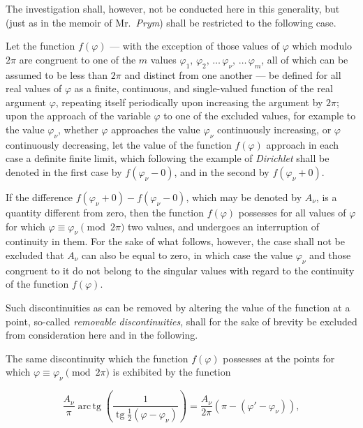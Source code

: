 \documentclass{article}
\begin{document}
The investigation shall, however, not be conducted here in this generality, but (just as in the memoir of Mr.~\emph{Prym}) shall be restricted to the following case.



Let the function $f(\varphi)$ --- with the exception of those values of $\varphi$ which modulo $2\pi$ are congruent to one of the $m$ values $\varphi_1, \, \varphi_2, \, \dots \, \varphi_\nu, \, \dots \, \varphi_m$, all of which can be assumed to be less than $2\pi$ and distinct from one another --- be defined for all real values of $\varphi$ as a finite, continuous, and single-valued function of the real argument $\varphi$, repeating itself periodically upon increasing the argument by $2\pi$; upon the approach of the variable $\varphi$ to one of the excluded values, for example to the value $\varphi_\nu$, whether $\varphi$ approaches the value $\varphi_\nu$ continuously increasing, or $\varphi$ continuously decreasing, let the value of the function $f(\varphi)$ approach in each case a definite finite limit, which following the example of \emph{Dirichlet} shall be denoted in the first case by $f(\varphi_\nu - 0)$, and in the second by $f(\varphi_\nu + 0)$.



If the difference $f(\varphi_\nu + 0) - f(\varphi_\nu - 0)$, which may be denoted by $A_\nu$, is a quantity different from zero, then the function $f(\varphi)$ possesses for all values of $\varphi$ for which $\varphi \equiv \varphi_\nu \pmod{2\pi}$ two values, and undergoes an interruption of continuity in them. For the sake of what follows, however, the case shall not be excluded that $A_\nu$ can also be equal to zero, in which case the value $\varphi_\nu$ and those congruent to it do not belong to the singular values with regard to the continuity of the function $f(\varphi)$.



Such discontinuities as can be removed by altering the value of the function at a point, so-called \emph{removable discontinuities}, shall for the sake of brevity be excluded from consideration here and in the following.



The same discontinuity which the function $f(\varphi)$ possesses at the points for which $\varphi \equiv \varphi_\nu \pmod{2\pi}$ is exhibited by the function

\[

\frac{A_\nu}{\pi} \operatorname{arc\,tg}\left(\frac{1}{\operatorname{tg}\frac{1}{2}(\varphi - \varphi_\nu)}\right) = \frac{A_\nu}{2\pi} (\pi - (\varphi' - \varphi_\nu)),

\]
\end{document}
